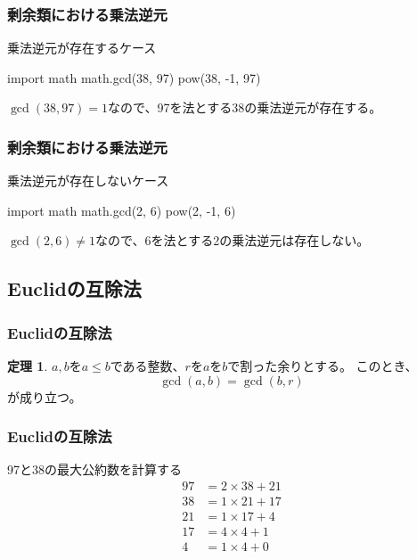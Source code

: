 \documentclass[aspectratio=169,dvipdfmx,14pt,notheorems]{beamer}
\theoremstyle{definition}
\newtheorem{theorem}{定理}
\begin{document}
\begin{frame}[fragile]\frametitle{剰余類における乗法逆元}

\begin{exampleblock}{乗法逆元が存在するケース}

\begin{pyconsole}
import math
math.gcd(38, 97)
pow(38, -1, 97)
\end{pyconsole}
\end{exampleblock}
$\gcd(38, 97) = 1$なので、97を法とする38の乗法逆元が存在する。
\end{frame}


\begin{frame}[fragile]\frametitle{剰余類における乗法逆元}

\begin{alertblock}{乗法逆元が存在しないケース}

\begin{pyconsole}
import math
math.gcd(2, 6)
pow(2, -1, 6)
\end{pyconsole}
\end{alertblock}
$\gcd(2, 6) \neq 1$なので、6を法とする2の乗法逆元は存在しない。
\end{frame}

\subsection{Euclidの互除法}

\begin{frame}[fragile]\frametitle{Euclidの互除法}
\begin{theorem}
$a, b$を$a \leq b$である整数、$r$を$a$を$b$で割った余りとする。
このとき、
\begin{equation*}
\gcd(a, b) = \gcd(b, r)
\end{equation*}
が成り立つ。
\end{theorem}
\end{frame}

\begin{frame}[fragile]\frametitle{Euclidの互除法}
\begin{exampleblock}{97と38の最大公約数を計算する}
\begin{align*}
97 &= 2 \times 38 + 21 \\
38 &= 1 \times 21 + 17 \\
21 &= 1 \times 17 + 4 \\
17 &= 4 \times 4 + 1 \\
4 &= 1 \times 4 + 0
\end{align*}
\end{exampleblock}
\end{frame}
\end{document}
